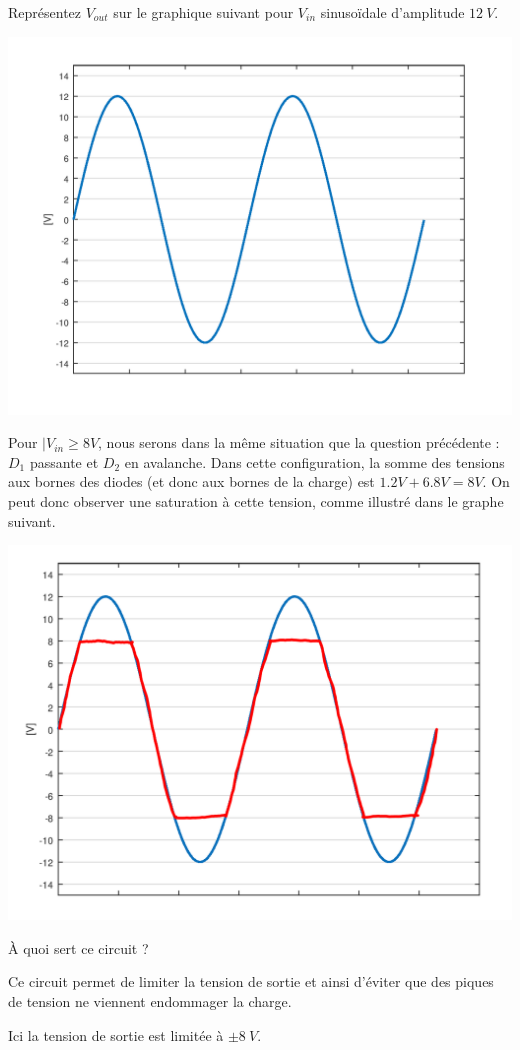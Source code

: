 \documentclass{../template/tp}
\begin{document}
\Question
{
    Représentez $ V_{out} $ sur le graphique suivant pour  $ V_{in} $ sinusoïdale d'amplitude $ 12~V $.
    
    \includegraphics[width=.8\textwidth]{sinus.png}
    

}{

    Pour $| V_{in} \geq 8 V$, nous serons dans la même situation que la question précédente : $D_1$ passante et $D_2$ en avalanche.
    Dans cette configuration, la somme des tensions aux bornes des diodes (et donc aux bornes de la charge) est $1.2 V + 6.8 V = 8 V$.
    On peut donc observer une saturation à cette tension, comme illustré dans le graphe suivant.

    \begin{center}
    \includegraphics[width=.8\textwidth]{sinus_correction.png}
    \end{center}
}

\Question
{
    À quoi sert ce circuit ?
}{
    Ce circuit permet de limiter la tension de sortie et ainsi d'éviter que des piques de tension ne viennent endommager la charge.
    
    Ici la tension de sortie est limitée à $ \pm 8~V $.
}
\end{document}

